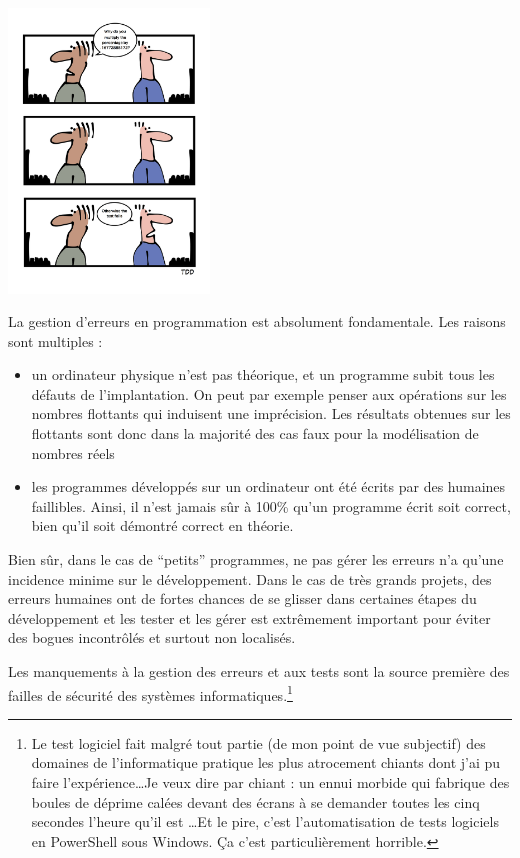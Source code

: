 \documentclass[../../../main.tex]{subfiles}
\begin{document}
\begin{minipage}{\textwidth}
	\begin{center}
		\includegraphics[width=0.4\textwidth]{meme1}
	\end{center}
\end{minipage}

La gestion d'erreurs en programmation est absolument fondamentale. Les raisons sont multiples :
\begin{itemize}
	\item un ordinateur physique n'est pas théorique, et un programme subit tous les défauts de l'implantation.
On peut par exemple penser aux opérations sur les nombres flottants qui induisent une imprécision.
Les résultats obtenues sur les flottants sont donc dans la majorité des cas faux pour la modélisation
de nombres réels
	\item les programmes développés sur un ordinateur ont été écrits par des humaines faillibles. Ainsi, il
n'est jamais sûr à 100\% qu'un programme écrit soit correct, bien qu'il soit démontré correct en
théorie.
\end{itemize}
Bien sûr, dans le cas de ``petits'' programmes, ne pas gérer les erreurs n'a qu'une incidence minime sur
le développement. Dans le cas de très grands projets, des erreurs humaines ont de fortes chances de
se glisser dans certaines étapes du développement et les tester et les gérer est extrêmement important
pour éviter des bogues incontrôlés et surtout non localisés.

Les manquements à la gestion des erreurs et aux tests sont la source première des failles de sécurité
des systèmes informatiques.\footnote{Le test logiciel fait malgré tout partie (de mon point de vue subjectif) des domaines de l'informatique pratique les plus atrocement chiants dont j'ai pu faire l'expérience\dots Je veux dire par chiant : un ennui morbide qui fabrique des boules de déprime calées devant des écrans à se demander toutes les cinq secondes l'heure qu'il est \dots Et le pire, c'est l'automatisation de tests logiciels en PowerShell sous Windows. Ça c'est particulièrement horrible.}
\end{document}
